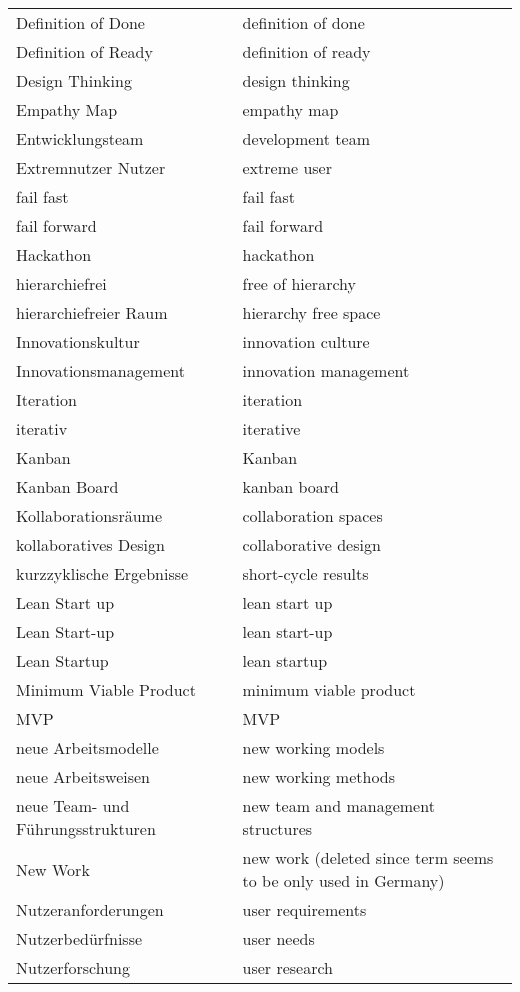 \begin{spacing}{.5}
\begin{longtable}{ p{} p{}}
    Definition of Done & definition of done \\
    Definition of Ready & definition of ready \\
    Design Thinking & design thinking \\
    Empathy Map & empathy map \\
    Entwicklungsteam & development team \\
    Extremnutzer Nutzer & extreme user \\
    fail fast & fail fast \\
    fail forward & fail forward \\
    Hackathon & hackathon \\
    hierarchiefrei & free of hierarchy \\
    hierarchiefreier Raum & hierarchy free space \\
    Innovationskultur & innovation culture \\
    Innovationsmanagement & innovation management \\
    Iteration & iteration \\
    iterativ & iterative \\
    Kanban & Kanban \\
    Kanban Board & kanban board \\
    Kollaborationsräume & collaboration spaces \\
    kollaboratives Design & collaborative design \\
    kurzzyklische Ergebnisse & short-cycle results \\
    Lean Start up & lean start up \\
    Lean Start-up & lean start-up \\
    Lean Startup & lean startup \\
    Minimum Viable Product & minimum viable product \\
    MVP & MVP \\
    neue Arbeitsmodelle & new working models \\
    neue Arbeitsweisen & new working methods \\
    neue Team- und Führungsstrukturen & new team and management structures \\
    New Work & new work (deleted since term seems to be only used in Germany)\\
    Nutzeranforderungen & user requirements \\
    Nutzerbedürfnisse & user needs \\
    Nutzerforschung & user research \\

\end{longtable}
\end{spacing}
